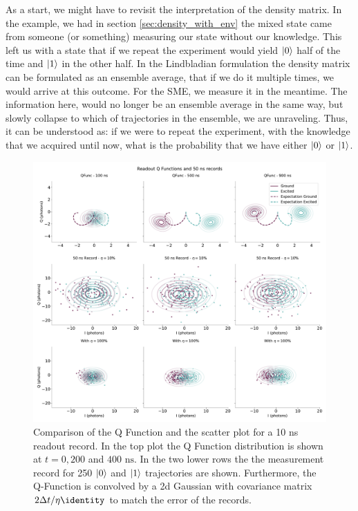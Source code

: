 As a start, we might have to revisit the interpretation of the density matrix. In the example, we had in section \ref{sec:density_with_env} the mixed state came from someone (or something) measuring our state without our knowledge. This left us with a state that if we repeat the experiment would yield $\ket{0}$ half of the time and $\ket{1}$ in the other half. In the Lindbladian formulation the density matrix can be formulated as an ensemble average, that if we do it multiple times, we would arrive at this outcome. For the SME, we measure it in the meantime. The information here, would no longer be an ensemble average in the same way, but slowly collapse to which of trajectories in the ensemble, we are unraveling. Thus, it can be understood as: if we were to repeat the experiment, with the knowledge that we acquired until now, what is the probability that we have either $\ket{0}$ or $\ket{1}$. 
\begin{figure}[t]
    \centering
    \includegraphics[]{Simulations/readout_simulations/figures/qfunc_trajectories.pdf}
    \caption{Comparison of the Q Function and the scatter plot for a 10 ns readout record. In the top plot the Q Function distribution is shown at $t = 0, 200$ and $400 \text{ ns}$. In the two lower rows the the measurement record for 250 $\ket{0}$ and $\ket{1}$ trajectories are shown. Furthermore, the Q-Function is convolved by a 2d Gaussian with covariance matrix $2 \Delta t / \eta \identity$ to match the error of the records.}
    \label{fig:trajectories_and_qfunc}
\end{figure}

